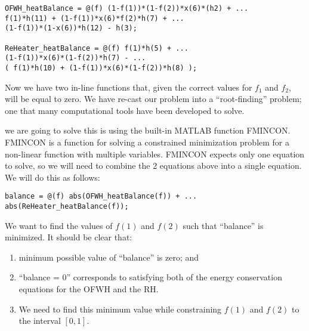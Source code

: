 \begin{minipage}{\linewidth} 
\begin{lstlisting}[caption=Energy balance equations in MATLAB format]
% f = [f1,f2]
OFWH_heatBalance = @(f) (1-f(1))*(1-f(2))*x(6)*(h2) + ...
f(1)*h(11) + (1-f(1))*x(6)*f(2)*h(7) + ...
(1-f(1))*(1-x(6))*h(12) - h(3);

ReHeater_heatBalance = @(f) f(1)*h(5) + ...
(1-f(1))*x(6)*(1-f(2))*h(7) - ...
( f(1)*h(10) + (1-f(1))*x(6)*(1-f(2))*h(8) );
\end{lstlisting}
\end{minipage}
Now we have two in-line functions that, given the correct values for $f_1$ and $f_2$, will be equal to zero.  We have re-cast our problem into a ``root-finding'' problem; one that many computational tools have been developed to solve.

 we are going to solve this is using the built-in MATLAB function FMINCON.  FMINCON is a function for solving a constrained minimization problem for a non-linear function with multiple variables.  FMINCON expects only one equation to solve, so we will need to combine the 2 equations above into a single equation.  We will do this as follows:

\begin{lstlisting}[caption=Combine two heat balace equations into one.]
balance = @(f) abs(OFWH_heatBalance(f)) + ...
abs(ReHeater_heatBalance(f));
\end{lstlisting}
We want to find the values of $f(1)$ and $f(2)$ such that ``balance'' is minimized.  It should be clear that:
\begin{enumerate}
\item minimum possible value of ``balance'' is zero; and
\item ``balance = 0'' corresponds to satisfying both of the energy conservation equations for the OFWH and the RH.
\item We need to find this minimum value while constraining $f(1)$ and $f(2)$ to the interval $[0,1]$.
\end{enumerate}

